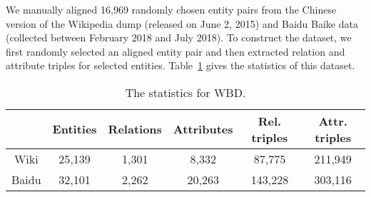 %	
%	
	
	 We manually aligned 16,969 randomly chosen entity pairs from the Chinese version of the Wikipedia dump (released on June 2, 2015) and Baidu Baike data (collected between February 2018 and July 2018).
	To construct the dataset, we first randomly  selected an aligned entity pair and then extracted relation and attribute triples for selected entities.
	Table~\ref{dataset} gives the statistics of this dataset.
	




	\begin{table}
	\centering
	\scriptsize
	\begin{tabular}{c|ccccc}
		\toprule
		&\bf  Entities &\bf  Relations &\bf  Attributes &\bf  Rel. triples &\bf  Attr. triples \\
		\midrule
		Wiki & 25,139 & 1,301 & 8,332 & 87,775 & 211,949 \\
		Baidu & 32,101 & 2,262 & 20,263 & 143,228 & 303,116 \\
		\bottomrule
	\end{tabular}
	\caption{The statistics for WBD.}
	\label{dataset}
\end{table}


